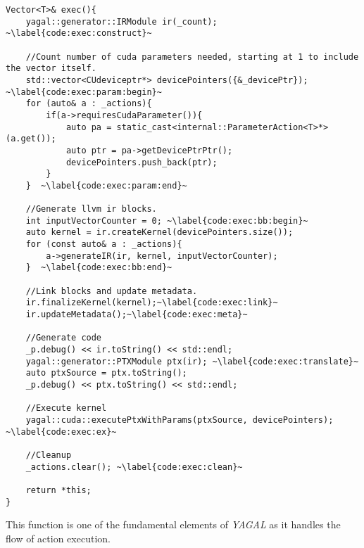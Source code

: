 \begin{lstlisting}[caption={The exec function}, label={code:exec}]
Vector<T>& exec(){
    yagal::generator::IRModule ir(_count); ~\label{code:exec:construct}~

    //Count number of cuda parameters needed, starting at 1 to include the vector itself.
    std::vector<CUdeviceptr*> devicePointers({&_devicePtr}); ~\label{code:exec:param:begin}~
    for (auto& a : _actions){
        if(a->requiresCudaParameter()){
            auto pa = static_cast<internal::ParameterAction<T>*>(a.get());
            auto ptr = pa->getDevicePtrPtr();
            devicePointers.push_back(ptr);
        }
    }  ~\label{code:exec:param:end}~

    //Generate llvm ir blocks.
    int inputVectorCounter = 0; ~\label{code:exec:bb:begin}~
    auto kernel = ir.createKernel(devicePointers.size());
    for (const auto& a : _actions){
        a->generateIR(ir, kernel, inputVectorCounter);
    }  ~\label{code:exec:bb:end}~

    //Link blocks and update metadata.
    ir.finalizeKernel(kernel);~\label{code:exec:link}~
    ir.updateMetadata();~\label{code:exec:meta}~

    //Generate code
    _p.debug() << ir.toString() << std::endl;
    yagal::generator::PTXModule ptx(ir); ~\label{code:exec:translate}~
    auto ptxSource = ptx.toString();
    _p.debug() << ptx.toString() << std::endl;
    
    //Execute kernel
    yagal::cuda::executePtxWithParams(ptxSource, devicePointers);  ~\label{code:exec:ex}~

    //Cleanup
    _actions.clear(); ~\label{code:exec:clean}~

    return *this;
}
\end{lstlisting}

This function is one of the fundamental elements of \textit{YAGAL} as it handles the flow of action execution.

